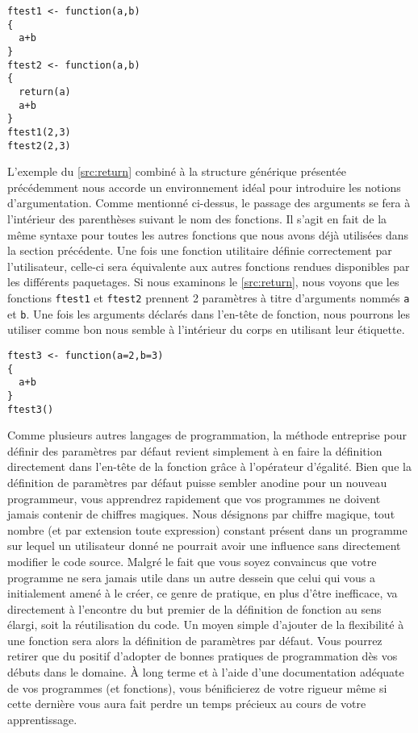\begin{lstlisting}[caption = L'instruction \texttt{return} et le retour standard d'une fonction R ,label=src:return]
ftest1 <- function(a,b)
{
  a+b
}
ftest2 <- function(a,b)
{
  return(a)
  a+b
}
ftest1(2,3)
ftest2(2,3)
\end{lstlisting}

\vspace{\baselineskip}
L'exemple du \autoref{src:return} combiné à la structure générique présentée précédemment nous accorde un environnement idéal pour introduire les notions d'argumentation. Comme mentionné ci-dessus, le passage des arguments se fera à l'intérieur des parenthèses suivant le nom des fonctions. Il s'agit en fait de la même syntaxe pour toutes les autres fonctions que nous avons déjà utilisées dans la section précédente. Une fois une fonction utilitaire définie correctement par l'utilisateur, celle-ci sera équivalente aux autres fonctions rendues disponibles par les différents paquetages. Si nous examinons le \autoref{src:return}, nous voyons que les fonctions \texttt{ftest1} et \texttt{ftest2} prennent 2 paramètres à titre d'arguments nommés \texttt{a} et \texttt{b}. Une fois les arguments déclarés dans l'en-tête de fonction, nous pourrons les utiliser comme bon nous semble à l'intérieur du corps en utilisant leur étiquette.

\begin{lstlisting}[caption = Définir des valeurs par défauts dans les fonctions utilitaires,label=src:defaultParams]
ftest3 <- function(a=2,b=3)
{
  a+b
}
ftest3()
\end{lstlisting}

\vspace{\baselineskip}
Comme plusieurs autres langages de programmation, la méthode entreprise pour définir des paramètres par défaut revient simplement à en faire la définition directement dans l'en-tête de la fonction grâce à l'opérateur d'égalité. Bien que la définition de paramètres par défaut puisse sembler anodine pour un nouveau programmeur, vous apprendrez rapidement que vos programmes ne doivent jamais contenir de chiffres magiques. Nous désignons par chiffre magique, tout nombre (et par extension toute expression) constant présent dans un programme sur lequel un utilisateur donné ne pourrait avoir une influence sans directement modifier le code source. Malgré le fait que vous soyez convaincus que votre programme ne sera jamais utile dans un autre dessein que celui qui vous a initialement amené à le créer, ce genre de pratique, en plus d'être inefficace, va directement à l'encontre du but premier de la définition de fonction au sens élargi, soit la réutilisation du code. Un moyen simple d'ajouter de la flexibilité à une fonction sera alors la définition de paramètres par défaut. Vous pourrez retirer que du positif d'adopter de bonnes pratiques de programmation dès vos débuts dans le domaine. À long terme et à l'aide d'une documentation adéquate de vos programmes (et fonctions), vous bénificierez de votre rigueur même si cette dernière vous aura fait perdre un temps précieux au cours de votre apprentissage. \\

